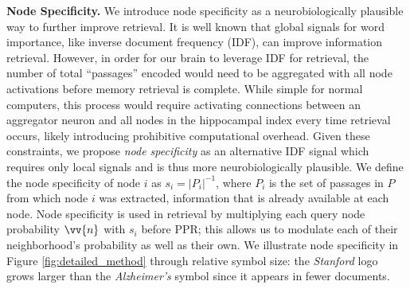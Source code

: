 \documentclass{article}
\begin{document}
\noindent \textbf{Node Specificity.} We introduce node specificity as a neurobiologically plausible way to further improve retrieval. 
It is well known that global signals for word importance, like inverse document frequency (IDF), can improve information retrieval.
However, in order for our brain to leverage IDF for retrieval, the number of total ``passages'' encoded would need to be aggregated with all node activations before memory retrieval is complete. 
While simple for normal computers, this process would require activating connections between an aggregator neuron and all nodes in the hippocampal index every time retrieval occurs, likely introducing prohibitive computational overhead.
Given these constraints, we propose \textit{node specificity} as an alternative IDF signal which requires only local signals and is thus more neurobiologically plausible.
We define the node specificity of node $i$ as $s_i = |P_i|^{-1}$, where $P_i$ is the set of passages in $P$ from which node $i$ was extracted, information that is already available at each node.
Node specificity is used in retrieval by multiplying each query node probability $\vv{n}$ with $s_i$ before PPR; this allows us to modulate each of their neighborhood's probability as well as their own.
We illustrate node specificity in Figure \ref{fig:detailed_method} through relative symbol size: the \textit{Stanford} logo grows larger than the \textit{Alzheimer's} symbol since it appears in fewer documents.

\end{document}
